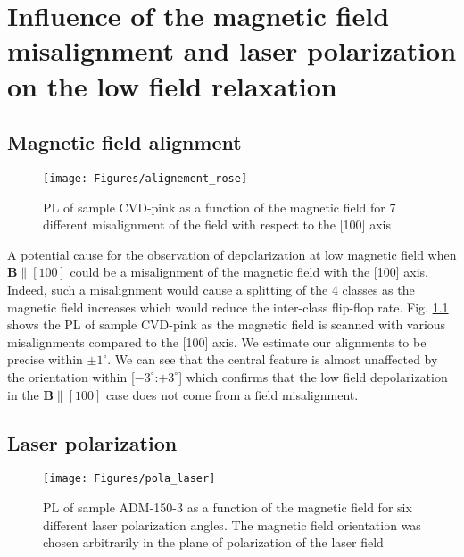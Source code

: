 \documentclass[a4paper,11pt]{report}
\title{}
\begin{document}
\chapter{Influence of the magnetic field misalignment and laser polarization on the low field relaxation}

\section{Magnetic field alignment}
\begin{figure}[h]
\centering
\texttt{[image: Figures/alignement\_rose]}
\caption{PL of sample CVD-pink as a function of the magnetic field for 7 different misalignment of the field with respect to the [100] axis}
\label{alignement rose}
\end{figure}

A potential cause for the observation of depolarization at low magnetic field when $\mathbf{B} \parallel [100]$ could be a misalignment of the magnetic field with the [100] axis. Indeed, such a misalignment would cause a splitting of the 4 classes as the magnetic field increases which would reduce the inter-class flip-flop rate. %
Fig. \ref{alignement rose} shows the PL of sample CVD-pink as the magnetic field is scanned with various misalignments compared to the [100] axis. We estimate our alignments to be precise within $\pm 1^\circ$. We can see that the central feature is almost unaffected by the orientation within [$-3^\circ$:$+3^\circ$] which confirms that the low field depolarization in the $\mathbf{B} \parallel [100]$ case does not come from a field misalignment.

\section{Laser polarization}
\begin{figure}[h]
\centering
\texttt{[image: Figures/pola\_laser]}
\caption{PL of sample ADM-150-3 as a function of the magnetic field for six different laser polarization angles. The magnetic field orientation was chosen arbitrarily in the plane of polarization of the laser field}
\label{pola laser}
\end{figure}
\end{document}
